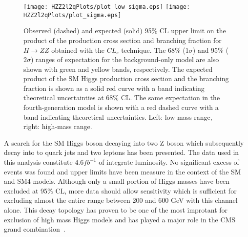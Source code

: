 \begin{figure}
\begin{center}
\texttt{[image: HZZ2l2qPlots/plot\_low\_sigma.eps]}
\texttt{[image: HZZ2l2qPlots/plot\_sigma.eps]}
\label{fig:HZZ2l2qLimitsSM4}
\caption{Observed (dashed) and expected (solid) 95\% CL upper limit on
the product of the production cross section and branching fraction for 
$H\to ZZ$ obtained with the $CL_s$ technique.  The 68\% ($1\sigma$) 
and 95\% ($2\sigma$) ranges of expectation for the background-only model
are also shown with green and yellow bands, respectively.  The expected
product of the SM Higgs production cross section and the branching
fraction is shown as a solid red curve with a band indicating theoretical
uncertainties at 68\% CL.  The same expectation in the fourth-generation
model is shown with a red dashed curve with a band indicating theoretical
uncertainties.  Left: low-mass range, right: high-mass range.  }
\end{center}
\end{figure}

A search for the SM Higgs boson decaying into two Z boson which
subsequently decay into to quark jets and two leptons has been presented.
The data used in this analysis constitute $4.6fb^{-1}$ of integrate
luminosity.  No significant excess of events was found and upper limits
have been measure in the context of the SM and SM4 models.  Although 
only a small portion of Higgs masses have been excluded at 95\% CL, 
more data should allow sensitivity which is sufficient for excluding almost
the entire range between 200 and 600 GeV with this channel alone.  
This decay topology has proven
to be one of the most improtant for exclusion of high mass Higgs models and
has played a major role in the CMS grand combination~\cite{???}. 
